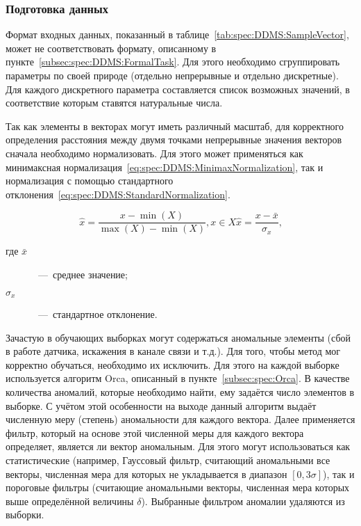 \subsubsection{Подготовка данных}
Формат входных данных, показанный в таблице~\ref{tab:spec:DDMS:SampleVector}, может не соответствовать формату, описанному в пункте~\ref{subsec:spec:DDMS:FormalTask}. Для этого необходимо сгруппировать параметры по своей природе (отдельно непрерывные и отдельно дискретные). Для каждого дискретного параметра составляется список возможных значений, в соответствие которым ставятся натуральные числа.

Так как элементы в векторах могут иметь различный масштаб, для корректного определения расстояния между двумя точками непрерывные значения векторов сначала необходимо нормализовать. Для этого может применяться как минимаксная нормализация~\eqref{eq:spec:DDMS:MinimaxNormalization}, так и нормализация с помощью стандартного отклонения~\eqref{eq:spec:DDMS:StandardNormalization}.

\begin{subequations}
\begin{equation} \label{eq:spec:DDMS:MinimaxNormalization}
\hat{x} = \frac{x - \min(X)}{\max(X) - \min(X)}, x\in X
\end{equation}
\begin{equation} \label{eq:spec:DDMS:StandardNormalization}
\hat{x} = \frac{x - \bar{x}}{\sigma_x} \text{,}
\end{equation}
\end{subequations}
\begin{description}
	\item[где $\bar{x}$]~---~среднее значение;
	\item[$\sigma_x$]~---~стандартное отклонение.
\end{description}

Зачастую в обучающих выборках могут содержаться аномальные элементы (сбой в работе датчика, искажения в канале связи и т.д.). Для того, чтобы метод мог корректно обучаться, необходимо их исключить. Для этого на каждой выборке используется алгоритм Orca, описанный в пункте~\ref{subsec:spec:Orca}. В качестве количества аномалий, которые необходимо найти, ему задаётся число элементов в выборке. С учётом этой особенности на выходе данный алгоритм выдаёт численную меру (степень) аномальности для каждого вектора. Далее применяется фильтр, который на основе этой численной меры для каждого вектора определяет, является ли вектор аномальным. Для этого могут использоваться как статистические (например, Гауссовый фильтр, считающий аномальными все векторы, численная мера для которых не укладывается в диапазон $[0, 3\sigma]$), так и пороговые фильтры (считающие аномальными векторы, численная мера которых выше определённой величины $\delta$). Выбранные фильтром аномалии удаляются из выборки.


